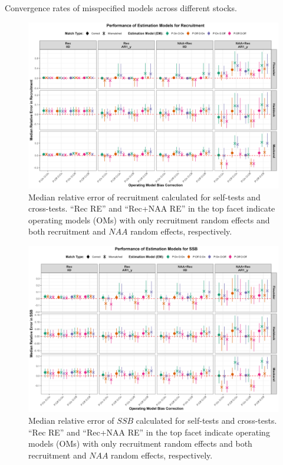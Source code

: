 \documentclass[
  12pt,
]{article}
\begin{document}
\begin{table}[H]
    \centering
    \caption{Convergence rates of misspecified models across different stocks.}
    \label{supp_convergence_tab}
    
\end{table}

\renewcommand{\thetable}{\arabic{table}}

\renewcommand{\thefigure}{S\arabic{figure}}
\setcounter{figure}{0}

\begin{figure}[H]
\centering
\includegraphics[width=\textwidth]{Revised_Figures&Tables/OM_EM_Comparison_Plot_Rec.PNG}
\caption{Median relative error of recruitment calculated for self-tests and cross-tests. ``Rec RE'' and ``Rec+NAA RE'' in the top facet indicate operating models (OMs) with only recruitment random effects and both recruitment and $NAA$ random effects, respectively.}
\label{fig:supp_OM_EM_Comparison_Plot_Rec}
\end{figure}

\begin{figure}[H]
\centering
\includegraphics[width=\textwidth]{Revised_Figures&Tables/OM_EM_Comparison_Plot_SSB.PNG}
\caption{Median relative error of $SSB$ calculated for self-tests and cross-tests. ``Rec RE'' and ``Rec+NAA RE'' in the top facet indicate operating models (OMs) with only recruitment random effects and both recruitment and $NAA$ random effects, respectively.}
\label{fig:supp_OM_EM_Comparison_Plot_SSB}
\end{figure}
\end{document}
